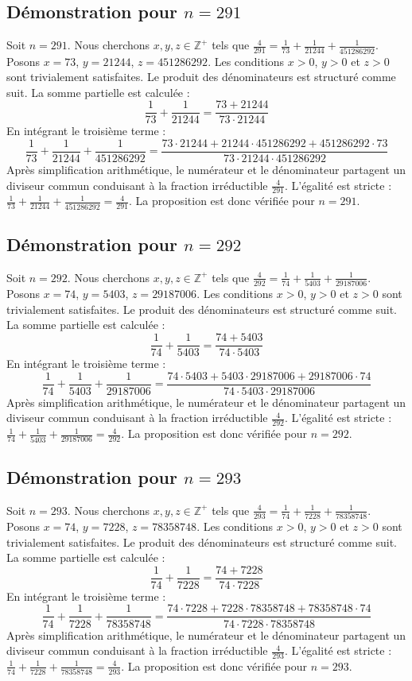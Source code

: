 \documentclass[11pt,a4paper]{article}
\begin{document}
\subsection{Démonstration pour $n = 291$}
Soit $n = 291$. Nous cherchons $x, y, z \in \mathbb{Z}^{+}$ tels que $\frac{4}{291} = \frac{1}{73} + \frac{1}{21244} + \frac{1}{451286292}$.
Posons $x = 73$, $y = 21244$, $z = 451286292$.
Les conditions $x > 0$, $y > 0$ et $z > 0$ sont trivialement satisfaites.
Le produit des dénominateurs est structuré comme suit. La somme partielle est calculée :
$$ \frac{1}{73} + \frac{1}{21244} = \frac{73+21244}{73 \cdot 21244} $$
En intégrant le troisième terme :
$$ \frac{1}{73} + \frac{1}{21244} + \frac{1}{451286292} = \frac{73 \cdot 21244 + 21244 \cdot 451286292 + 451286292 \cdot 73}{73 \cdot 21244 \cdot 451286292} $$
Après simplification arithmétique, le numérateur et le dénominateur partagent un diviseur commun conduisant à la fraction irréductible $\frac{4}{291}$.
L'égalité est stricte : $\frac{1}{73} + \frac{1}{21244} + \frac{1}{451286292} = \frac{4}{291}$.
La proposition est donc vérifiée pour $n = 291$.
\subsection{Démonstration pour $n = 292$}
Soit $n = 292$. Nous cherchons $x, y, z \in \mathbb{Z}^{+}$ tels que $\frac{4}{292} = \frac{1}{74} + \frac{1}{5403} + \frac{1}{29187006}$.
Posons $x = 74$, $y = 5403$, $z = 29187006$.
Les conditions $x > 0$, $y > 0$ et $z > 0$ sont trivialement satisfaites.
Le produit des dénominateurs est structuré comme suit. La somme partielle est calculée :
$$ \frac{1}{74} + \frac{1}{5403} = \frac{74+5403}{74 \cdot 5403} $$
En intégrant le troisième terme :
$$ \frac{1}{74} + \frac{1}{5403} + \frac{1}{29187006} = \frac{74 \cdot 5403 + 5403 \cdot 29187006 + 29187006 \cdot 74}{74 \cdot 5403 \cdot 29187006} $$
Après simplification arithmétique, le numérateur et le dénominateur partagent un diviseur commun conduisant à la fraction irréductible $\frac{4}{292}$.
L'égalité est stricte : $\frac{1}{74} + \frac{1}{5403} + \frac{1}{29187006} = \frac{4}{292}$.
La proposition est donc vérifiée pour $n = 292$.
\subsection{Démonstration pour $n = 293$}
Soit $n = 293$. Nous cherchons $x, y, z \in \mathbb{Z}^{+}$ tels que $\frac{4}{293} = \frac{1}{74} + \frac{1}{7228} + \frac{1}{78358748}$.
Posons $x = 74$, $y = 7228$, $z = 78358748$.
Les conditions $x > 0$, $y > 0$ et $z > 0$ sont trivialement satisfaites.
Le produit des dénominateurs est structuré comme suit. La somme partielle est calculée :
$$ \frac{1}{74} + \frac{1}{7228} = \frac{74+7228}{74 \cdot 7228} $$
En intégrant le troisième terme :
$$ \frac{1}{74} + \frac{1}{7228} + \frac{1}{78358748} = \frac{74 \cdot 7228 + 7228 \cdot 78358748 + 78358748 \cdot 74}{74 \cdot 7228 \cdot 78358748} $$
Après simplification arithmétique, le numérateur et le dénominateur partagent un diviseur commun conduisant à la fraction irréductible $\frac{4}{293}$.
L'égalité est stricte : $\frac{1}{74} + \frac{1}{7228} + \frac{1}{78358748} = \frac{4}{293}$.
La proposition est donc vérifiée pour $n = 293$.
\end{document}
